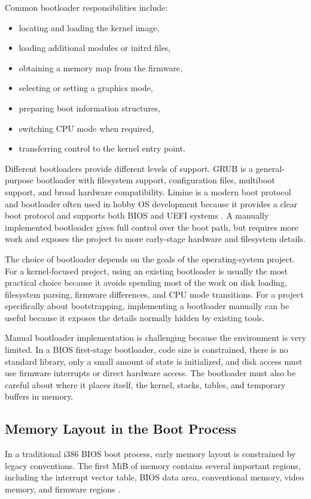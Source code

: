 Common bootloader responsibilities include:
\begin{itemize}
  \item locating and loading the kernel image,
  \item loading additional modules or initrd files,
  \item obtaining a memory map from the firmware,
  \item selecting or setting a graphics mode,
  \item preparing boot information structures,
  \item switching CPU mode when required,
  \item transferring control to the kernel entry point.
\end{itemize}

Different bootloaders provide different levels of support. GRUB is a general-purpose bootloader with filesystem support, configuration files, multiboot support, and broad hardware compatibility. Limine is a modern boot protocol and bootloader often used in hobby OS development because it provides a clear boot protocol and supports both BIOS and UEFI systems \cite{osdevBootSequence,limineProtocol}. A manually implemented bootloader gives full control over the boot path, but requires more work and exposes the project to more early-stage hardware and filesystem details.

The choice of bootloader depends on the goals of the operating-system project. For a kernel-focused project, using an existing bootloader is usually the most practical choice because it avoids spending most of the work on disk loading, filesystem parsing, firmware differences, and CPU mode transitions. For a project specifically about bootstrapping, implementing a bootloader manually can be useful because it exposes the details normally hidden by existing tools.

Manual bootloader implementation is challenging because the environment is very limited. In a BIOS first-stage bootloader, code size is constrained, there is no standard library, only a small amount of state is initialized, and disk access must use firmware interrupts or direct hardware access. The bootloader must also be careful about where it places itself, the kernel, stacks, tables, and temporary buffers in memory.

\subsection{Memory Layout in the Boot Process}
In a traditional i386 BIOS boot process, early memory layout is constrained by legacy conventions. The first MiB of memory contains several important regions, including the interrupt vector table, BIOS data area, conventional memory, video memory, and firmware regions \cite{osdevMemoryMapX86}.

